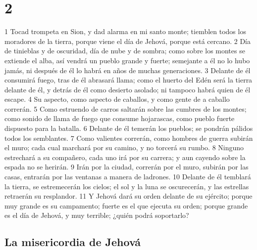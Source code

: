 \chapter{2}

1 Tocad trompeta en Sion, y dad alarma en mi santo monte; tiemblen todos los moradores de la tierra, porque viene el día de Jehová, porque está cercano.
2 Día de tinieblas y de oscuridad, día de nube y de sombra; como sobre los montes se extiende el alba, así vendrá un pueblo grande y fuerte; semejante a él no lo hubo jamás, ni después de él lo habrá en años de muchas generaciones.
3 Delante de él consumirá fuego, tras de él abrasará llama; como el huerto del Edén será la tierra delante de él, y detrás de él como desierto asolado; ni tampoco habrá quien de él escape.
4 Su aspecto, como aspecto de caballos, y como gente de a caballo correrán.
5 Como estruendo de carros saltarán sobre las cumbres de los montes; como sonido de llama de fuego que consume hojarascas, como pueblo fuerte dispuesto para la batalla. 
6 Delante de él temerán los pueblos; se pondrán pálidos todos los semblantes.
7 Como valientes correrán, como hombres de guerra subirán el muro; cada cual marchará por su camino, y no torcerá su rumbo.
8 Ninguno estrechará a su compañero, cada uno irá por su carrera; y aun cayendo sobre la espada no se herirán.
9 Irán por la ciudad, correrán por el muro, subirán por las casas, entrarán por las ventanas a manera de ladrones.
10 Delante de él temblará la tierra, se estremecerán los cielos; el sol y la luna se oscurecerán, y las estrellas retraerán su resplandor. 
11 Y Jehová dará su orden delante de su ejército; porque muy grande es su campamento; fuerte es el que ejecuta su orden; porque grande es el día de Jehová, y muy terrible; ¿quién podrá soportarlo? 

\section*{La misericordia de Jehová}

